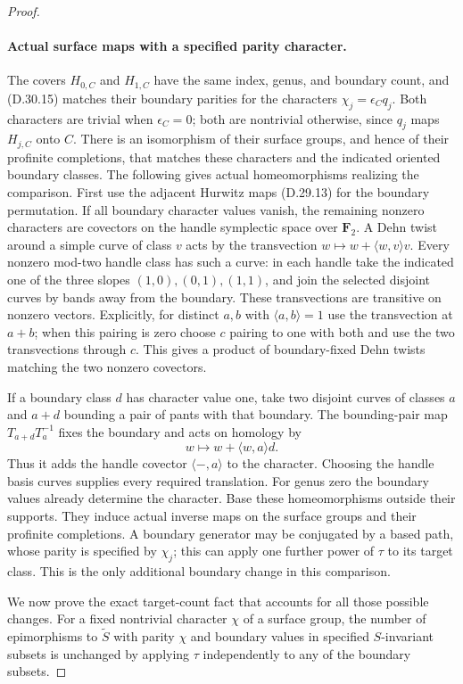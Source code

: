 \begin{proof}
\paragraph{Actual surface maps with a specified parity character.}
The covers $H_{0,C}$ and $H_{1,C}$ have the same
index, genus, and boundary count, and
\textup{(D.30.15)} matches their boundary parities
for the characters $\chi_j=\epsilon_Cq_j$.
Both characters are trivial when $\epsilon_C=0$;
both are nontrivial otherwise, since $q_j$ maps
$H_{j,C}$ onto $C$.
There is an isomorphism of their surface groups,
and hence of their profinite completions, that
matches these characters and the indicated
oriented boundary classes.  The following gives
actual homeomorphisms realizing the comparison.
First use the adjacent Hurwitz maps
\textup{(D.29.13)} for the boundary permutation.
If all boundary character values vanish, the
remaining nonzero characters are covectors on
the handle symplectic space over $\mathbf F_2$.
A Dehn twist around a simple curve of class $v$
acts by the transvection $w\mapsto w+\langle w,v\rangle v$.
Every nonzero mod-two handle class has such a
curve: in each handle take the indicated one
of the three slopes $(1,0),(0,1),(1,1)$, and
join the selected disjoint curves by bands
away from the boundary.  These transvections
are transitive on nonzero vectors.  Explicitly,
for distinct $a,b$ with $\langle a,b\rangle=1$
use the transvection at $a+b$; when this pairing
is zero choose $c$ pairing to one with both
and use the two transvections through $c$.
This gives a product of boundary-fixed Dehn
twists matching the two nonzero covectors.

If a boundary class $d$ has character value
one, take two disjoint curves of classes
$a$ and $a+d$ bounding a pair of pants with
that boundary.  The bounding-pair map
$T_{a+d}T_a^{-1}$ fixes the boundary and acts
on homology by
\[
                 w\longmapsto w+\langle w,a\rangle d.
 \tag{D.30.17}
\]
Thus it adds the handle covector
$\langle -,a\rangle$ to the character.  Choosing
the handle basis curves supplies every required
translation.  For genus zero the boundary
values already determine the character.
Base these homeomorphisms outside their supports.
They induce actual inverse maps on the surface
groups and their profinite completions.  A
boundary generator may be conjugated by a
based path, whose parity is specified by
$\chi_j$; this can apply one further power of
$\tau$ to its target class.  This is the only
additional boundary change in this comparison.

We now prove the exact target-count fact that
accounts for all those possible changes.
For a fixed nontrivial character $\chi$ of a
surface group, the number of epimorphisms to
$\widetilde S$ with parity $\chi$ and boundary
values in specified $S$-invariant subsets is
unchanged by applying $\tau$ independently to
any of the boundary subsets.


\end{proof}
